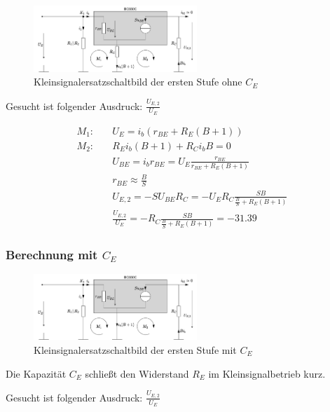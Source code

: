 \begin{figure}[H]
    \centering
    \includegraphics[width = 0.55\textwidth]{tex/1_Microphone/pictures/KKSESB_ohne_CE.pdf}
    \caption{Kleinsignalersatzschaltbild der ersten Stufe ohne $C_E$}
    \label{fig:my_label}
\end{figure}

Gesucht ist folgender Ausdruck: $\frac{U_{E,2}}{U_E}$

\begin{align*}
    M_1:& \quad U_E = i_b \left( r_{BE} + R_E \left( B + 1\right) \right) \\
    M_2:& \quad R_E i_b (B+1) + R_C i_b B = 0 \\
    {} & \quad U_{BE} = i_b r_{BE} = U_E \frac{r_{BE}}{r_{BE}+R_E(B+1)}\\
    {} & \quad r_{BE} \approx \frac{B}{S}\\
    {} & \quad U_{E,2} = - S U_{BE} R_C = - U_E R_C \frac{S B}{\frac{B}{S}+R_E(B+1)}\\
    & \quad \frac{U_{E,2}}{U_E} = - R_C \frac{S B}{\frac{B}{S}+R_E(B+1)} = -31.39
\end{align*}

\subsubsection{Berechnung mit $C_E$}

\begin{figure}[H]
    \centering
    \includegraphics[width = 0.55\textwidth]{tex/1_Microphone/pictures/KKSESB_mit_CE.pdf}
    \caption{Kleinsignalersatzschaltbild der ersten Stufe mit $C_E$}
    \label{fig:my_label}
\end{figure}

Die Kapazität $C_E$ schließt den Widerstand $R_E$ im Kleinsignalbetrieb kurz.

Gesucht ist folgender Ausdruck: $\frac{U_{E,2}}{U_E}$

